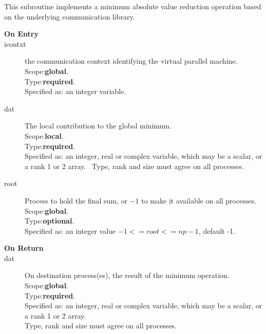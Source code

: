 This subroutine implements a minimum absolute value reduction
operation based on the underlying communication library. 
\begin{description}
\item[\bf  On Entry ]
\item[icontxt] the communication context identifying the virtual
  parallel machine.\\
Scope:{\bf global}.\\
Type:{\bf required}.\\
Specified as: an integer variable.
\item[dat] The local contribution to the global minimum.\\
Scope:{\bf local}.\\
Type:{\bf required}.\\
Specified as: an integer, real or complex variable, which may be a
scalar, or a rank 1 or 2 array. \
Type, rank and size must agree on all processes.
\item[root] Process to hold the final sum, or $-1$ to make it available
  on all processes.\\
Scope:{\bf global}.\\
Type:{\bf optional}.\\
Specified as: an integer value $-1<= root <= np-1$, default -1. \\
\end{description}


\begin{description}
\item[\bf On Return]
\item[dat] On destination process(es), the result of the minimum operation.\\
Scope:{\bf global}.\\
Type:{\bf required}.\\
Specified as: an integer, real or complex variable, which may be a
scalar, or a rank 1 or 2 array. \\
Type, rank and size must agree on all processes.
\end{description}




